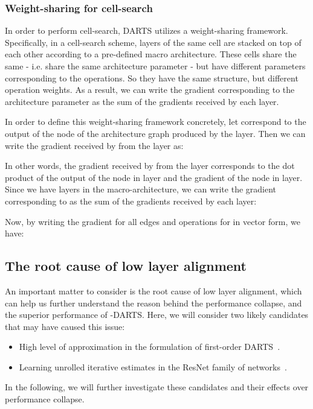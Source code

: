 \documentclass{article} \usepackage{fancyhdr, iclr2023_conference, times}
\newcommand{\mydarts}{-DARTS\xspace}
\newcommand{\lambdafn}{layer alignment\xspace}
\begin{document}
\subsubsection{Weight-sharing for cell-search}
\par In order to perform cell-search, DARTS utilizes a weight-sharing framework. Specifically, in a cell-search scheme,  layers of the same cell are stacked on top of each other according to a pre-defined macro architecture. These cells share the same  - i.e. share the same architecture parameter - but have different parameters corresponding to the operations. So they have the same structure, but different operation weights. As a result, we can write the gradient corresponding to the architecture parameter as the sum of the gradients received by each layer.
\par In order to define this weight-sharing framework concretely, let  correspond to the output of the  node of the architecture graph produced by the  layer. Then we can write the gradient received by  from the  layer as:

In other words, the gradient received by  from the  layer corresponds to the dot product of the output of the  node in  layer and the gradient of the  node in  layer. Since we have  layers in the macro-architecture, we can write the gradient corresponding to  as the sum of the gradients received by each layer:

\par Now, by writing the gradient for all edges and operations for  in vector form, we have:

\subsection{The root cause of low \lambdafn}
\label{appndx:cause-of-lambdafn}
\par An important matter to consider is the root cause of low \lambdafn, which can help us further understand the reason behind the performance collapse, and the superior performance of \mydarts. Here, we will consider two likely candidates that may have caused this issue:
\begin{itemize}
    \item High level of approximation in the formulation of first-order DARTS~\citep{DBLP:conf/icml/ZhangSPCAH21}.
    \item Learning unrolled iterative estimates in the ResNet family of networks~\citep{DBLP:conf/iclr/GreffSS17}.
\end{itemize}
In the following, we will further investigate these candidates and their effects over performance collapse.
\end{document}
